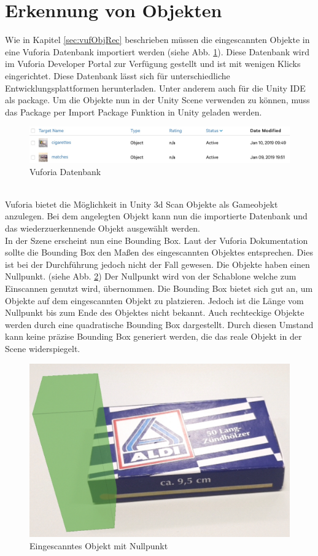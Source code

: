 \section{Erkennung von Objekten}
Wie in Kapitel \ref{sec:vufObjRec} beschrieben müssen die eingescannten Objekte in eine Vuforia Datenbank importiert werden (siehe Abb. \ref{fig:vuforiaObjectDatabase}). Diese Datenbank wird im Vuforia Developer Portal zur Verfügung gestellt und ist mit wenigen Klicks eingerichtet. Diese Datenbank lässt sich für unterschiedliche Entwicklungsplattformen herunterladen. Unter anderem auch für die Unity IDE als package. Um die Objekte nun in der Unity Scene verwenden zu können, muss das Package per Import Package Funktion in Unity geladen werden.
\begin{figure}[h]
    \centering
    \includegraphics[width=\textwidth]{assets/vuforiaDataBase.jpeg}
    \caption{Vuforia Datenbank}\label{fig:vuforiaObjectDatabase}
\end{figure}\\
Vuforia bietet die Möglichkeit in Unity 3d Scan Objekte als Gameobjekt anzulegen. Bei dem angelegten Objekt kann nun die importierte Datenbank und das wiederzuerkennende Objekt ausgewählt werden. \\
In der Szene erscheint nun eine Bounding Box. Laut der Vuforia Dokumentation\cite{VufObjRec}  sollte die Bounding Box den Maßen des eingescannten Objektes entsprechen. Dies ist bei der Durchführung jedoch nicht der Fall gewesen. Die Objekte haben einen Nullpunkt. (siehe Abb. \ref{fig:matches}) Der Nullpunkt wird von der Schablone welche zum Einscannen genutzt wird, übernommen. Die Bounding Box bietet sich gut an, um Objekte auf dem eingescannten Objekt zu platzieren. Jedoch ist die Länge vom Nullpunkt bis zum Ende des Objektes nicht bekannt. Auch rechteckige Objekte werden durch eine quadratische Bounding Box dargestellt. Durch diesen Umstand kann keine präzise Bounding Box generiert werden, die das reale Objekt in der Scene widerspiegelt.\\
\begin{figure}[h]
    \centering
    \includegraphics[width=0.5\linewidth]{assets/matches.png}
    \caption{Eingescanntes Objekt mit Nullpunkt}\label{fig:matches}
\end{figure}\\
